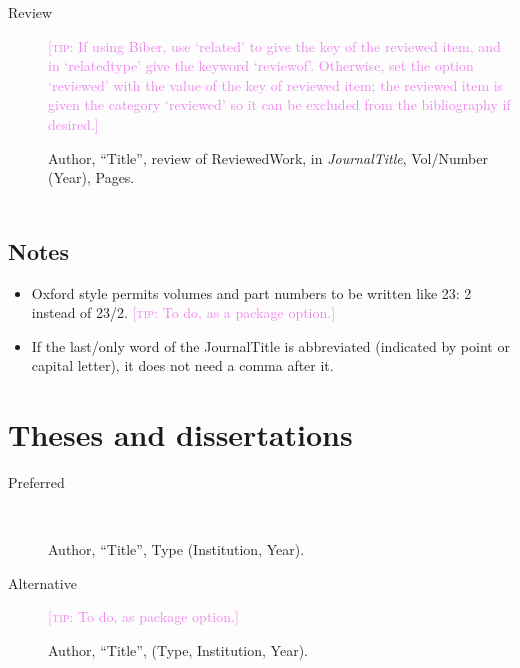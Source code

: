 \documentclass[extrafontsizes,11pt,a4paper,oneside]{memoir}
\newcommand*{\lit}[1]{\textsf{#1}}
\newcommand*{\code}[1]{`\textsf{#1}'}
\newcommand*{\aside}[1]{\textcolor{violet}{[\textsc{tip:} #1]}}
\begin{document}
\begin{description}
  \item[Review] \aside{If using Biber, use \code{related} to give the key of the reviewed item, and in \code{relatedtype} give the keyword \code{reviewof}. Otherwise, set the option \code{reviewed} with the value of the key of reviewed item; the reviewed item is given the category \code{reviewed} so it can be excluded from the bibliography if desired.}
  \par Author, \enquote{Title}, \lit{review of} ReviewedWork, \lit{in} \emph{JournalTitle}, Vol/Number (Year), Pages.
  \\
  \\
\end{description}

\section{Notes}

\begin{itemize}
  \item Oxford style permits volumes and part numbers to be written like 23: 2 instead of 23/2. \aside{To do, as a package option.}
  
  \item If the last\slash only word of the JournalTitle is abbreviated (indicated by point or capital letter), it does not need a comma after it.
  \\
\end{itemize}

\chapter{Theses and dissertations}\label{sec:thesis}

\begin{description}
  \item[Preferred]~\par Author, \enquote{Title}, Type (Institution, Year).
  \\
  
  \item[Alternative] \aside{To do, as package option.}\par Author, \enquote{Title}, (Type, Institution, Year).
\end{description}
\end{document}

